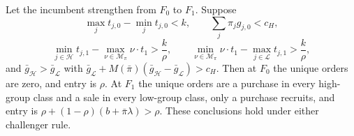 \begin{proposition}\label{prop:manyclasses}
Let the incumbent strengthen from \(F_0\) to \(F_1\). Suppose
\[
\max_jt_{j,0}-\min_jt_{j,0}<k,\qquad \sum_j\pi_jg_{j,0}<c_H,
\]
\[
\min_{j\in\mathcal H}t_{j,1}-\max_{\nu\in\mathcal M_\pi}\nu\cdot t_1>\frac k\rho,\qquad
\min_{\nu\in\mathcal M_\pi}\nu\cdot t_1-\max_{j\in\mathcal L}t_{j,1}>\frac k\rho,
\]
and \(\bar g_{\mathcal H}>\bar g_{\mathcal L}\) with \(\bar g_{\mathcal L}+M(\bar\pi)(\bar g_{\mathcal H}-\bar
g_{\mathcal L})>c_H\). Then at \(F_0\) the unique orders are zero, and entry is \(\rho\). At \(F_1\) the unique orders
are a purchase in every high-group class and a sale in every low-group class, only a purchase recruits, and entry is
\(\rho+(1-\rho)(b+\bar\pi\lambda)>\rho\). These conclusions hold under either challenger rule.
\end{proposition}

